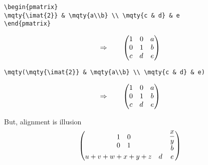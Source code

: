 \documentclass{article}
\begin{document}
\begin{minipage}{9cm}
\begin{verbatim}
\begin{pmatrix}
\mqty{\imat{2}} & \mqty{a\\b} \\ \mqty{c & d} & e
\end{pmatrix}
\end{verbatim}
\end{minipage}
\begin{minipage}{6cm}
\begin{displaymath}
\Rightarrow\qquad
\begin{pmatrix}
\mqty{\imat{2}} & \mqty{a\\b} \\ \mqty{c & d} & e
\end{pmatrix}
\end{displaymath}
\end{minipage}

\begin{minipage}{9cm}
\begin{verbatim}
\mqty(\mqty{\imat{2}} & \mqty{a\\b} \\ \mqty{c & d} & e)
\end{verbatim}
\end{minipage}
\begin{minipage}{6cm}
\begin{displaymath}
\Rightarrow\qquad
\mqty(\mqty{\imat{2}} & \mqty{a\\b} \\ \mqty{c & d} & e)
\end{displaymath}
\end{minipage}

But, alignment is illusion
\[
  \begin{pmatrix}
    \mqty{\imat{2}} & \mqty{\displaystyle\frac{x}{y}\\b} \\ \mqty{u+v+w+x+y+z & d} & e
  \end{pmatrix}
\]
\end{document}
